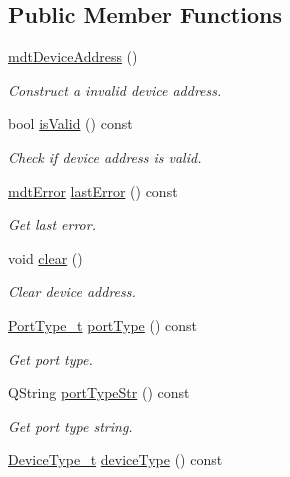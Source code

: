 \subsection*{Public Member Functions}
\begin{DoxyCompactItemize}
\item 
\hyperlink{classmdt_device_address_a9ac376c3c78e38b558562b5ed99db198}{mdt\-Device\-Address} ()
\begin{DoxyCompactList}\small\item\em Construct a invalid device address. \end{DoxyCompactList}\item 
bool \hyperlink{classmdt_device_address_a609981a120aa87451079551c655a181e}{is\-Valid} () const 
\begin{DoxyCompactList}\small\item\em Check if device address is valid. \end{DoxyCompactList}\item 
\hyperlink{classmdt_error}{mdt\-Error} \hyperlink{classmdt_device_address_a8078b5665a3711c1b4453b38aa428880}{last\-Error} () const 
\begin{DoxyCompactList}\small\item\em Get last error. \end{DoxyCompactList}\item 
void \hyperlink{classmdt_device_address_aa12409b1152de08b83362d19ce7bb5fc}{clear} ()
\begin{DoxyCompactList}\small\item\em Clear device address. \end{DoxyCompactList}\item 
\hyperlink{classmdt_device_address_a87fedc5c0ede4736bcc939f453bf0ed0}{Port\-Type\-\_\-t} \hyperlink{classmdt_device_address_a0ae6efdb6183d5e333cdf898e05bc18f}{port\-Type} () const 
\begin{DoxyCompactList}\small\item\em Get port type. \end{DoxyCompactList}\item 
Q\-String \hyperlink{classmdt_device_address_a4ff25fe7acef148034084fbf0c294bbd}{port\-Type\-Str} () const 
\begin{DoxyCompactList}\small\item\em Get port type string. \end{DoxyCompactList}\item 
\hyperlink{classmdt_device_address_a8e776267826886cd846fb2d75b9b7b2b}{Device\-Type\-\_\-t} \hyperlink{classmdt_device_address_a5834b156ce7240dfdc3f3fe7da629c53}{device\-Type} () const 

\end{DoxyCompactItemize}
